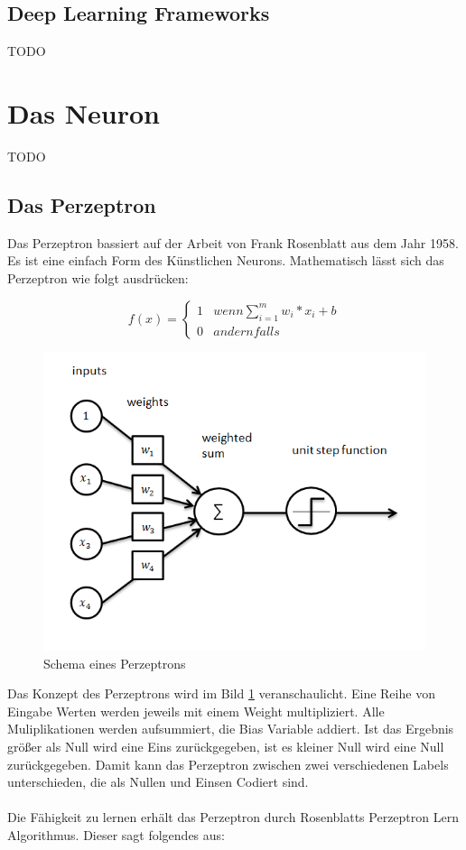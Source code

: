 \documentclass[conference, german]{IEEEtran}
\begin{document}
\subsection{Deep Learning Frameworks}
TODO
\section{Das Neuron}
TODO
\subsection{Das Perzeptron}
Das Perzeptron bassiert auf der Arbeit von Frank Rosenblatt aus dem Jahr 1958.
Es ist eine einfach Form des Künstlichen Neurons.
Mathematisch lässt sich das Perzeptron wie folgt ausdrücken:
	
	\[
	f(x) = 
	\begin{cases}
	1 & wenn \displaystyle\sum_{i=1}^{m} w_i * x_i + b \\
	0 & andernfalls 
	\end{cases}	
	\]
	
\begin{figure}[H]
	\includegraphics[width=\linewidth]{img/perceptron.png}
	\caption{Schema eines Perzeptrons\citep{ML_PYTHON}}
	\label{fig:perceptron}
\end{figure}	

Das Konzept des Perzeptrons wird im Bild \ref{fig:perceptron} veranschaulicht.
Eine Reihe von Eingabe Werten werden jeweils mit einem Weight multipliziert.
Alle Muliplikationen werden aufsummiert, die Bias Variable addiert. Ist das Ergebnis größer als Null wird eine Eins zurückgegeben, ist es kleiner Null wird eine Null zurückgegeben. Damit kann das Perzeptron zwischen zwei verschiedenen Labels unterschieden, die als Nullen und Einsen Codiert sind. 
\\\\
Die Fähigkeit zu lernen erhält das Perzeptron durch Rosenblatts Perzeptron Lern Algorithmus. Dieser sagt folgendes aus:
\end{document}
